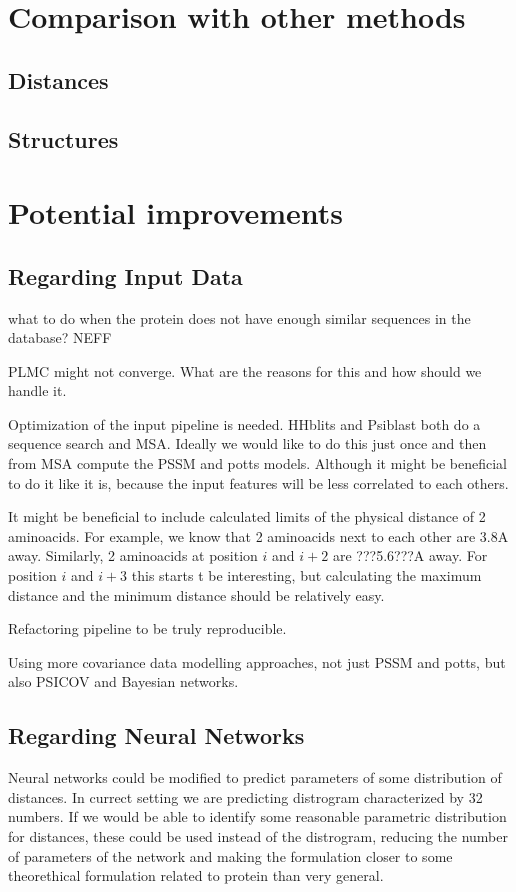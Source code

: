 \section{Comparison with other methods}
\subsection{Distances}
\subsection{Structures}

\section{Potential improvements}

\subsection{Regarding Input Data}
what to do when the protein does not have enough similar sequences in the database?
NEFF

PLMC might not converge. What are the reasons for this and how should we handle it.

Optimization of the input pipeline is needed.
HHblits and Psiblast both do a sequence search and MSA.
Ideally we would like to do this just once and then from MSA compute the PSSM and potts models.
Although it might be beneficial to do it like it is, because the input features will be less correlated to each others.

It might be beneficial to include calculated limits of the physical distance of 2 aminoacids.
For example, we know that 2 aminoacids next to each other are 3.8A away.
Similarly, 2 aminoacids at position $i$ and $i+2$ are ???5.6???A away.
For position $i$ and $i+3$ this starts t be interesting, but calculating the maximum distance and the minimum distance should be relatively easy.

Refactoring pipeline to be truly reproducible.

Using more covariance data modelling approaches, not just PSSM and potts, but also PSICOV and Bayesian networks.

\subsection{Regarding Neural Networks}
Neural networks could be modified to predict parameters of some distribution of distances.
In currect setting we are predicting distrogram characterized by 32 numbers.
If we would be able to identify some reasonable parametric distribution for distances, these could be used instead of the distrogram, reducing the number of parameters of the network and making the formulation closer to some theorethical formulation related to protein than very general.

